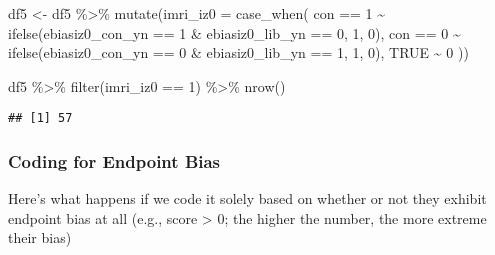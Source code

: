 \documentclass[
]{article}
\newenvironment{Shaded}{\begin{snugshade}}{\end{snugshade}}
\newcommand{\AttributeTok}[1]{\textcolor[rgb]{0.77,0.63,0.00}{#1}}
\newcommand{\ConstantTok}[1]{\textcolor[rgb]{0.00,0.00,0.00}{#1}}
\newcommand{\DecValTok}[1]{\textcolor[rgb]{0.00,0.00,0.81}{#1}}
\newcommand{\FunctionTok}[1]{\textcolor[rgb]{0.00,0.00,0.00}{#1}}
\newcommand{\NormalTok}[1]{#1}
\newcommand{\OtherTok}[1]{\textcolor[rgb]{0.56,0.35,0.01}{#1}}
\newcommand{\SpecialCharTok}[1]{\textcolor[rgb]{0.00,0.00,0.00}{#1}}
\begin{document}
\begin{Shaded}
\begin{Highlighting}[]
\NormalTok{df5 }\OtherTok{\textless{}{-}}\NormalTok{ df5 }\SpecialCharTok{\%\textgreater{}\%} 
  \FunctionTok{mutate}\NormalTok{(}\AttributeTok{imri\_iz0 =} \FunctionTok{case\_when}\NormalTok{(}
\NormalTok{    con }\SpecialCharTok{==} \DecValTok{1} \SpecialCharTok{\textasciitilde{}} \FunctionTok{ifelse}\NormalTok{(ebiasiz0\_con\_yn }\SpecialCharTok{==} \DecValTok{1} \SpecialCharTok{\&}\NormalTok{ ebiasiz0\_lib\_yn }\SpecialCharTok{==} \DecValTok{0}\NormalTok{, }\DecValTok{1}\NormalTok{, }\DecValTok{0}\NormalTok{),}
\NormalTok{    con }\SpecialCharTok{==} \DecValTok{0} \SpecialCharTok{\textasciitilde{}} \FunctionTok{ifelse}\NormalTok{(ebiasiz0\_con\_yn }\SpecialCharTok{==} \DecValTok{0} \SpecialCharTok{\&}\NormalTok{ ebiasiz0\_lib\_yn }\SpecialCharTok{==} \DecValTok{1}\NormalTok{, }\DecValTok{1}\NormalTok{, }\DecValTok{0}\NormalTok{),}
    \ConstantTok{TRUE} \SpecialCharTok{\textasciitilde{}} \DecValTok{0}
\NormalTok{  ))}

\NormalTok{df5 }\SpecialCharTok{\%\textgreater{}\%} 
  \FunctionTok{filter}\NormalTok{(imri\_iz0 }\SpecialCharTok{==} \DecValTok{1}\NormalTok{) }\SpecialCharTok{\%\textgreater{}\%} 
  \FunctionTok{nrow}\NormalTok{()}
\end{Highlighting}
\end{Shaded}

\begin{verbatim}
## [1] 57
\end{verbatim}

\hypertarget{coding-for-endpoint-bias}{%
\subsubsection{Coding for Endpoint
Bias}\label{coding-for-endpoint-bias}}

Here's what happens if we code it solely based on whether or not they
exhibit endpoint bias at all (e.g., score \textgreater{} 0; the higher
the number, the more extreme their bias)
\end{document}
